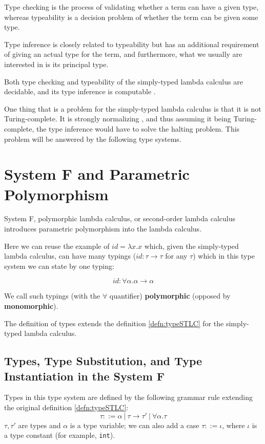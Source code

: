 Type checking is the process of validating whether a term can have a given type, whereas typeability is a decision problem of whether the term can be given some type.

Type inference is closely related to typeability but has an additional requirement of giving an actual type for the term, and furthermore, what we usually are interested in is its principal type.

Both type checking and typeability of the simply-typed lambda calculus are decidable, and its type inference is computable \cite{barendregt1992lambda}.

One thing that is a problem for the simply-typed lambda calculus is that it is not Turing-complete. It is strongly normalizing \cite{barendregt1992lambda}, and thus assuming it being Turing-complete, the type inference would have to solve the halting problem. This problem will be answered by the following type systems.

\section{System F and Parametric Polymorphism}

System F, polymorphic lambda calculus, or second-order lambda calculus introduces parametric polymorphism into the lambda calculus.

Here we can reuse the example of $id = \lambda x . x$ which, given the simply-typed lambda calculus, can have many typings ($id : \tau \rightarrow \tau$ for any $\tau$) which in this type system we can state by one typing:

$$id : \forall \alpha . \alpha \rightarrow \alpha$$

We call such typings (with the $\forall$ quantifier) \textbf{polymorphic} (opposed by \textbf{monomorphic}).

The definition of types extends the definition \ref{defn:typeSTLC} for the simply-typed lambda calculus.

\subsection{Types, Type Substitution, and Type Instantiation in the System F }

\begin{defn} Types in this type system are defined by the following grammar rule extending the original definition \ref{defn:typeSTLC}:
    $$\tau ::= \alpha\ |\ \tau \rightarrow \tau'\ |\ \forall \alpha . \tau$$
    $\tau, \tau'$ are types and $\alpha$ is a type variable; we can also add a case $\tau ::= \iota$, where $\iota$ is a type constant (for example, \lstinline{int}).
\end{defn}

